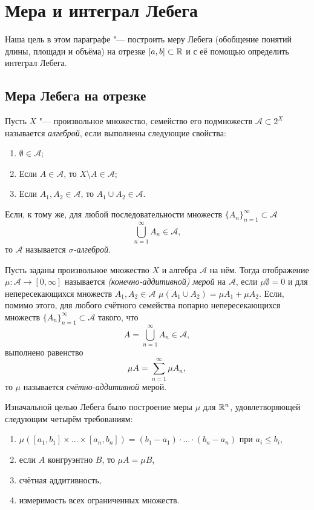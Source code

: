 \documentclass[main]{subfiles}
\begin{document}
\section{Мера и интеграл Лебега}%
Наша цель в этом параграфе "---
построить меру Лебега
(обобщение понятий длины, площади и объёма)
на отрезке \( [a, b] \subset \mathbb{R} \)
и с её помощью определить интеграл Лебега.

\subsection{Мера Лебега на отрезке}
\begin{definition}
  Пусть \( X \) "--- произвольное
  множество, семейство его подмножеств
  \( \mathcal{A} \subset 2^X \)
  называется \emph{алгеброй},
  если выполнены следующие свойства:
  \begin{enumerate}
    \item \( \emptyset \in \mathcal{A} \);
    \item Если \( A \in \mathcal{A} \),
      то \( X \setminus A \in \mathcal{A} \);
    \item Если \( A_1, A_2 \in \mathcal{A} \),
      то \( A_1 \cup A_2 \in \mathcal{A} \).
  \end{enumerate}
  Если, к тому же, для любой последовательности
  множеств \( {\{ A_n \}}_{n=1}^\infty \subset \mathcal{A} \)
  \[
    \bigcup_{n=1}^\infty A_n \in \mathcal{A},
  \]
  то \( \mathcal{A} \) называется \emph{\( \sigma \)-алгеброй}.
\end{definition}

\begin{definition}
  Пусть заданы произвольное множество \( X \)
  и алгебра \( \mathcal{A} \) на нём.
  Тогда отображение \( \mu : \mathcal{A} \to [0, \infty] \)
  называется \emph{(конечно-аддитивной) мерой}
  на \( \mathcal{A} \), если \( \mu \emptyset = 0 \)
  и для непересекающихся множеств \( A_1, A_2 \in \mathcal{A} \)
  \( \mu(A_1 \cup A_2) = \mu A_1 + \mu A_2 \).
  Если, помимо этого,
  для любого счётного семейства
  попарно непересекающихся множеств
  \( {\{ A_n \}}_{n=1}^\infty \subset \mathcal{A} \)
  такого, что
  \[ A = \bigcup_{n = 1}^\infty A_n \in \mathcal{A}, \]
  выполнено равенство
  \[ \mu A = \sum_{n=1}^\infty \mu A_n, \]
  то \( \mu \) называется \emph{счётно-аддитивной} мерой.
\end{definition}

Изначальной целью Лебега было
построение меры \( \mu \) для \( \mathbb{R}^n \),
удовлетворяющей следующим четырём требованиям:
\begin{enumerate}
  \item \( \mu ([a_1, b_1] \times \ldots \times [a_n, b_n]) =
    (b_1 - a_1) \cdot \ldots \cdot (b_n - a_n) \)
    при \( a_i \le b_i \),
  \item если \( A \) конгруэнтно \( B \), то
    \( \mu A = \mu B \),
  \item счётная аддитивность,
  \item измеримость всех ограниченных множеств.
\end{enumerate}
\end{document}
